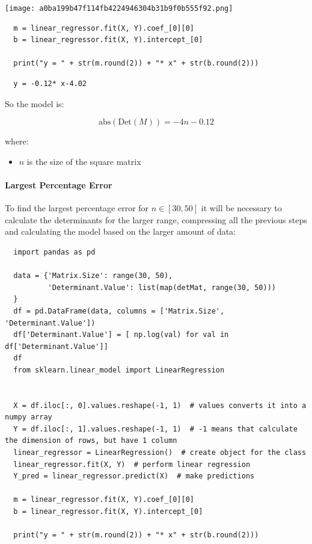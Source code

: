 \documentclass[11pt]{article}
\begin{document}
\begin{center}
\texttt{[image: a0ba199b47f114fb4224946304b31b9f0b555f92.png]}
\end{center}

\begin{verbatim}
  m = linear_regressor.fit(X, Y).coef_[0][0]
  b = linear_regressor.fit(X, Y).intercept_[0]

  print("y = " + str(m.round(2)) + "* x" + str(b.round(2)))
\end{verbatim}

\begin{verbatim}
  y = -0.12* x-4.02
\end{verbatim}

So the model is:

$$
\text{abs}(\text{Det}(M)) = -4n - 0.12
$$

where:

\begin{itemize}
\item \(n\) is the size of the square matrix
\end{itemize}

\paragraph{Largest Percentage Error}
\label{largest-percentage-error}
To find the largest percentage error for \(n \in [30, 50]\) it will be
necessary to calculate the determinants for the larger range,
compressing all the previous steps and calculating the model based on
the larger amount of data:

\begin{verbatim}
  import pandas as pd

  data = {'Matrix.Size': range(30, 50),
          'Determinant.Value': list(map(detMat, range(30, 50)))
  }
  df = pd.DataFrame(data, columns = ['Matrix.Size', 'Determinant.Value'])
  df['Determinant.Value'] = [ np.log(val) for val in df['Determinant.Value']]
  df
  from sklearn.linear_model import LinearRegression


  X = df.iloc[:, 0].values.reshape(-1, 1)  # values converts it into a numpy array
  Y = df.iloc[:, 1].values.reshape(-1, 1)  # -1 means that calculate the dimension of rows, but have 1 column
  linear_regressor = LinearRegression()  # create object for the class
  linear_regressor.fit(X, Y)  # perform linear regression
  Y_pred = linear_regressor.predict(X)  # make predictions

  m = linear_regressor.fit(X, Y).coef_[0][0]
  b = linear_regressor.fit(X, Y).intercept_[0]

  print("y = " + str(m.round(2)) + "* x" + str(b.round(2)))

\end{verbatim}
\end{document}

